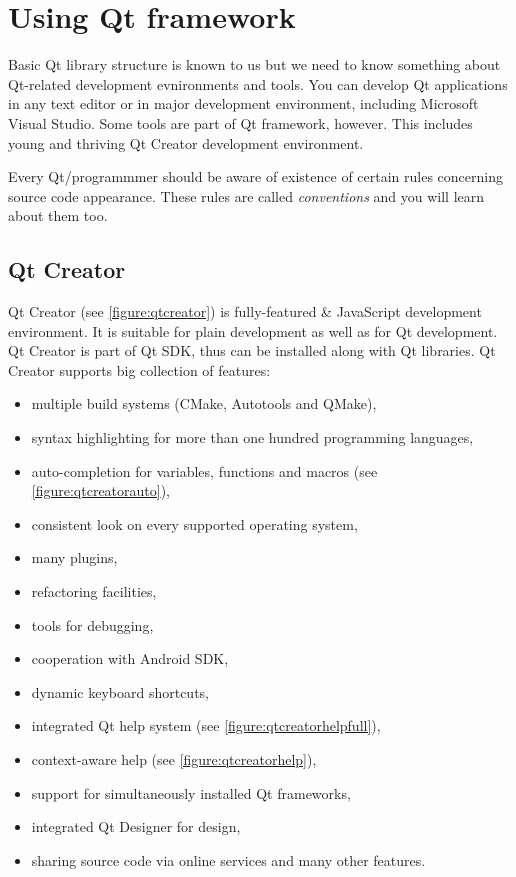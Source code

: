 \chapter{Using Qt framework}
Basic Qt library structure is known to us but we need to know something about Qt-related development evnironments and tools. You can develop Qt applications in any text editor or in major development environment, including Microsoft Visual Studio. Some tools are part of Qt framework, however. This includes young and thriving Qt Creator development environment.

Every Qt/\cpp programmmer should be aware of existence of certain rules concerning source code appearance. These rules are called \textit{conventions} and you will learn about them too.

\section{Qt Creator}
Qt Creator (see \autoref{figure:qtcreator}) is fully-featured \cpp{} \& JavaScript development environment. It is suitable for plain \cpp{}  development as well as for Qt development. Qt Creator is part of Qt SDK, thus can be installed along with Qt libraries. Qt Creator supports big collection of features:
\begin{itemize}
\item multiple build systems (CMake, Autotools and QMake),
\item syntax highlighting for more than one hundred programming languages,
\item auto-completion for variables, functions and macros (see \autoref{figure:qtcreatorauto}),
\item consistent look on every supported operating system,
\item many plugins,
\item refactoring facilities,
\item tools for debugging,
\item cooperation with Android SDK,
\item dynamic keyboard shortcuts,
\item integrated Qt help system (see \autoref{figure:qtcreatorhelpfull}),
\item context-aware help (see \autoref{figure:qtcreatorhelp}),
\item support for simultaneously installed Qt frameworks,
\item integrated Qt Designer for  design,
\item sharing source code via online services and many other features.
\end{itemize}

